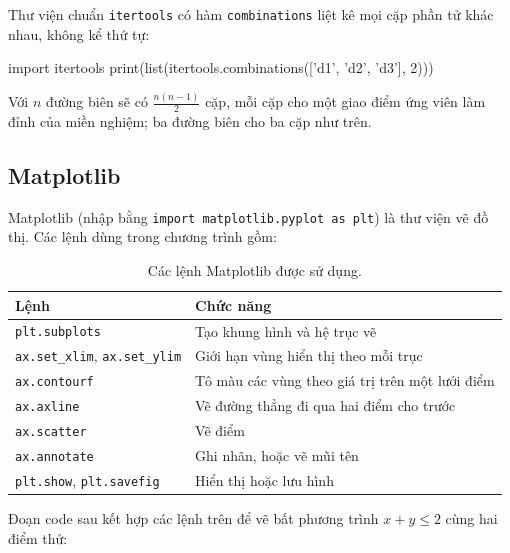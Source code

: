 \documentclass[12pt,a4paper]{report}
\begin{document}
Thư viện chuẩn \texttt{itertools} có hàm \texttt{combinations} liệt kê mọi cặp phần tử khác nhau, không kể thứ tự:

\begin{madoanbox}
import itertools
print(list(itertools.combinations(['d1', 'd2', 'd3'], 2)))
\end{madoanbox}

\begin{ketquabox}
\end{ketquabox}

Với $n$ đường biên sẽ có $\frac{n(n-1)}{2}$ cặp, mỗi cặp cho một giao điểm ứng viên làm đỉnh của miền nghiệm; ba đường biên cho ba cặp như trên.

\subsection*{Matplotlib}

Matplotlib (nhập bằng \texttt{import matplotlib.pyplot as plt}) là thư viện vẽ đồ thị. Các lệnh dùng trong chương trình gồm:

\begin{table}[htbp]
\centering
\small
\begin{tabular}{@{}>{\raggedright\arraybackslash}p{4.6cm}>{\raggedright\arraybackslash}p{8.4cm}@{}}
\toprule
Lệnh & Chức năng \\
\midrule
\texttt{plt.subplots} & Tạo khung hình và hệ trục vẽ \\
\texttt{ax.set\_xlim}, \texttt{ax.set\_ylim} & Giới hạn vùng hiển thị theo mỗi trục \\
\texttt{ax.contourf} & Tô màu các vùng theo giá trị trên một lưới điểm \\
\texttt{ax.axline} & Vẽ đường thẳng đi qua hai điểm cho trước \\
\texttt{ax.scatter} & Vẽ điểm \\
\texttt{ax.annotate} & Ghi nhãn, hoặc vẽ mũi tên \\
\texttt{plt.show}, \texttt{plt.savefig} & Hiển thị hoặc lưu hình \\
\bottomrule
\end{tabular}
\caption{Các lệnh Matplotlib được sử dụng.}
\label{tab:lenh-matplotlib}
\end{table}

Đoạn code sau kết hợp các lệnh trên để vẽ bất phương trình $x+y\le 2$ cùng hai điểm thử:
\end{document}
